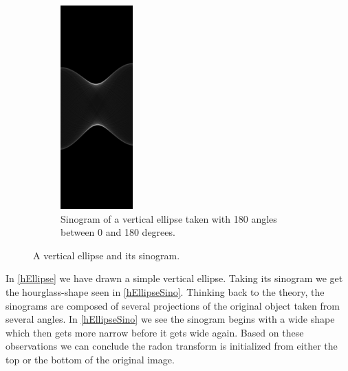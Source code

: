 \begin{figure}
\begin{subfigure}{0.48\linewidth}
		\includegraphics[height=1.5\linewidth]{Materials/hEllipseSino}
		\caption{Sinogram of a vertical ellipse taken with 180 angles between 0 and 180 degrees.}
		\label{hEllipseSino}
	\end{subfigure}
	\caption{A vertical ellipse and its sinogram.}
\end{figure}
In \autoref{hEllipse} we have drawn a simple vertical ellipse. Taking its sinogram we get the hourglass-shape seen in \autoref{hEllipseSino}. Thinking back to the theory, the sinograms are composed of several projections of the original object taken from several angles. In \autoref{hEllipseSino} we see the sinogram begins with a wide shape which then gets more narrow before it gets wide again. Based on these observations we can conclude the radon transform is initialized from either the top or the bottom of the original image.\\
